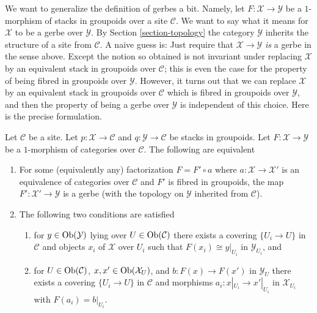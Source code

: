 \noindent
We want to generalize the definition of gerbes a bit. Namely, let
$F : \mathcal{X} \to \mathcal{Y}$ be a $1$-morphism of stacks in groupoids
over a site $\mathcal{C}$. We want to say what it
means for $\mathcal{X}$ to be a gerbe over $\mathcal{Y}$. By
Section \ref{section-topology}
the category $\mathcal{Y}$ inherits the structure of a site from
$\mathcal{C}$. A naive guess is: Just require that
$\mathcal{X} \to \mathcal{Y}$ {\it is} a gerbe in the sense above. Except
the notion so obtained is not invariant under replacing $\mathcal{X}$
by an equivalent stack in groupoids over $\mathcal{C}$; this is even the
case for the property of being fibred in groupoids over $\mathcal{Y}$.
However, it turns out that we can replace $\mathcal{X}$ by an equivalent
stack in groupoids over $\mathcal{C}$ which is fibred in groupoids over
$\mathcal{Y}$, and then the property of being a gerbe over $\mathcal{Y}$
is independent of this choice. Here is the precise formulation.

\begin{lemma}
\label{lemma-when-gerbe}
Let $\mathcal{C}$ be a site. Let $p : \mathcal{X} \to \mathcal{C}$
and $q : \mathcal{Y} \to \mathcal{C}$ be stacks in groupoids.
Let $F : \mathcal{X} \to \mathcal{Y}$ be a $1$-morphism of categories
over $\mathcal{C}$. The following are equivalent
\begin{enumerate}
\item For some (equivalently any) factorization $F = F' \circ a$ where
$a : \mathcal{X} \to \mathcal{X}'$ is an equivalence of categories over
$\mathcal{C}$ and $F'$ is fibred in groupoids, the map
$F' : \mathcal{X}' \to \mathcal{Y}$ is a gerbe (with the topology
on $\mathcal{Y}$ inherited from $\mathcal{C}$).
\item The following two conditions are satisfied
\begin{enumerate}
\item for $y \in \mathop{\mathrm{Ob}}\nolimits(\mathcal{Y})$ lying over
$U \in \mathop{\mathrm{Ob}}\nolimits(\mathcal{C})$ there exists a covering
$\{U_i \to U\}$ in $\mathcal{C}$ and objects $x_i$ of $\mathcal{X}$
over $U_i$ such that $F(x_i) \cong y|_{U_i}$ in $\mathcal{Y}_{U_i}$, and
\item for $U \in \mathop{\mathrm{Ob}}\nolimits(\mathcal{C})$,
$x, x' \in \mathop{\mathrm{Ob}}\nolimits(\mathcal{X}_U)$, and $b : F(x) \to F(x')$ in
$\mathcal{Y}_U$ there exists
a covering $\{U_i \to U\}$ in $\mathcal{C}$ and morphisms
$a_i : x|_{U_i} \to x'|_{U_i}$ in $\mathcal{X}_{U_i}$ with
$F(a_i) = b|_{U_i}$.
\end{enumerate}
\end{enumerate}
\end{lemma}


